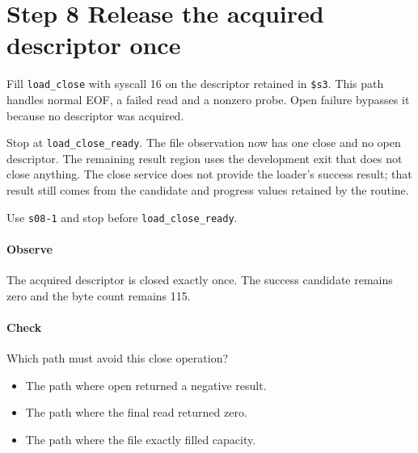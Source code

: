 \section{Step 8 Release the acquired descriptor once}\label{png-load-s08}
Fill \texttt{load\_close} with syscall 16 on the descriptor retained in \texttt{\$s3}. This path handles normal EOF, a failed read and a nonzero probe. Open failure bypasses it because no descriptor was acquired.

Stop at \texttt{load\_close\_ready}. The file observation now has one close and no open descriptor. The remaining result region uses the development exit that does not close anything. The close service does not provide the loader's success result; that result still comes from the candidate and progress values retained by the routine.

Use \texttt{s08-1} and stop before \texttt{load\_close\_ready}.

\paragraph{Observe} The acquired descriptor is closed exactly once. The success candidate remains zero and the byte count remains 115.

\paragraph{Check} Which path must avoid this close operation?
\begin{itemize}
  \item[A.] The path where open returned a negative result.
  \item[B.] The path where the final read returned zero.
  \item[C.] The path where the file exactly filled capacity.
\end{itemize}
